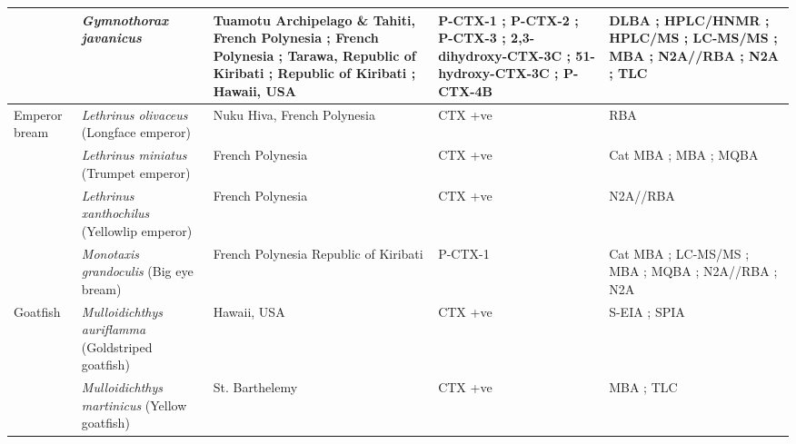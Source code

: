 \documentclass[12pt]{article}
\begin{document}
\begin{longtable}[l]{ | p{2cm} | p{3cm} | p{4.5cm} | p{2cm} | p{3cm} | }
	& \emph{Gymnothorax javanicus} & Tuamotu Archipelago \& Tahiti, French Polynesia \cite{labrousse1996toxicological,murata1990structures,legrand1997two}; French Polynesia \cite{chinain2014mail}; Tarawa, Republic of Kiribati \cite{lewis1997characterization}; Republic of Kiribati \cite{mak2013pacific}; Hawaii, USA \cite{scheuer1967ciguatoxin} & P-CTX-1 \cite{murata1990structures,lewis1991purification,lewis1997characterization,mak2013pacific}; P-CTX-2 \cite{lewis1991purification,mak2013pacific}; P-CTX-3 \cite{mak2013pacific,lewis1991purification,lewis1997characterization}; 2,3-dihydroxy-CTX-3C \cite{satake1998isolation}; 51-hydroxy-CTX-3C \cite{satake1998isolation}; P-CTX-4B \cite{murata1990structures,lewis1991purification} & DLBA \cite{labrousse1996toxicological}; HPLC/HNMR \cite{murata1990structures,lewis1991purification}; HPLC/MS \cite{lewis1997characterization,satake1998isolation}; LC-MS/MS \cite{mak2013pacific}; MBA \cite{lewis1997characterization,scheuer1967ciguatoxin,satake1998isolation}; N2A//RBA \cite{chinain2014mail}; N2A \cite{mak2013pacific}; TLC \cite{scheuer1967ciguatoxin} \\
	\hline
	Emperor bream & \emph{Lethrinus olivaceus} (Longface emperor) & Nuku Hiva, French Polynesia \cite{darius2007ciguatera} & CTX +ve \cite{darius2007ciguatera} & RBA \cite{darius2007ciguatera} \\
	& \emph{Lethrinus miniatus} (Trumpet emperor) & French Polynesia \cite{bagnis1987use} & CTX +ve \cite{bagnis1987use} & Cat MBA \cite{bagnis1987use}; MBA \cite{bagnis1987use}; MQBA \cite{bagnis1987use} \\
	& \emph{Lethrinus xanthochilus} (Yellowlip emperor) & French Polynesia \cite{chinain2014mail} & CTX +ve \cite{chinain2014mail} & N2A//RBA \cite{chinain2014mail} \\
	& \emph{Monotaxis grandoculis} (Big eye bream) & French Polynesia \cite{bagnis1987use,chinain2014mail} Republic of Kiribati \cite{mak2013pacific} & P-CTX-1 \cite{mak2013pacific} & Cat MBA \cite{bagnis1987use}; LC-MS/MS \cite{mak2013pacific}; MBA \cite{bagnis1987use}; MQBA \cite{bagnis1987use}; N2A//RBA \cite{chinain2014mail}; N2A \cite{mak2013pacific}\\
	\hline
	Goatfish & \emph{Mulloidichthys auriflamma} (Goldstriped goatfish) & Hawaii, USA \cite{hokama1990simplified} & CTX +ve \cite{hokama1990simplified} & S-EIA \cite{hokama1990simplified}; SPIA \cite{hokama1990simplified} \\
	& \emph{Mulloidichthys martinicus} (Yellow goatfish) & St. Barthelemy \cite{vernoux1986heterogeneity} & CTX +ve \cite{vernoux1986heterogeneity} & MBA \cite{vernoux1986heterogeneity}; TLC \cite{vernoux1986heterogeneity} \\

\end{longtable}
\end{document}
